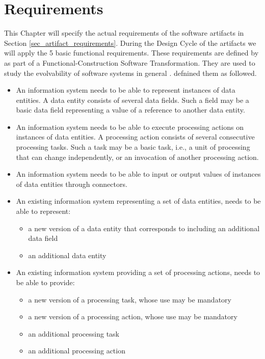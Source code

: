 \chapter{Requirements} \label{chap_requirements} 

This Chapter will specify the actual requirements of the software artifacts in Section
\ref{sec_artifact_requirements}. During the Design Cycle of the artifacts we will apply
the 5 basic functional requirements. These requirements are defined by as part of a
Functional-Construction Software Transformation. They are used to study the evolvability
of software systems in general \parencite[251]{mannaert_normalized_2016}.
\textcite[254-261]{mannaert_normalized_2016} defnined them as followed.

\begin{itemize}
    \item An information system needs to be able to represent instances of
    data entities. A data entity consists of several data fields. Such a field may be a basic
    data field representing a value of a reference to another data entity.
    
    \item An information system needs to be able to execute processing actions on
    instances of data entities. A processing action consists of several consecutive processing
    tasks. Such a task may be a basic task, i.e., a unit of processing that can change
    independently, or an invocation of another processing action.
    
    \item An information system needs to be able to input or output values
    of instances of data entities through connectors.
    
    \item An existing information system representing a set of data entities, needs
    to be able to represent: 
    \begin{itemize}
        \item a new version of a data entity that corresponds to including an additional
        data field
        \item an additional data entity 
    \end{itemize}
    
    \item An existing information system providing a set of processing
    actions, needs to be able to provide:
    \begin{itemize}
        \item a new version of a processing task, whose use may be mandatory
        \item a new version of a processing action, whose use may be mandatory
        \item an additional processing task
        \item an additional processing action
    \end{itemize}
    
\end{itemize}


